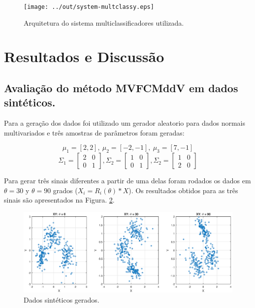 \documentclass[12pt]{article}
\begin{document}
\begin{figure}[h]
\centering
\texttt{[image: ../out/system-multclassy.eps]}
\caption{Arquitetura do sistema multiclassificadores utilizada.}
\label{fig:mult_system_classy}
\end{figure}  



\section{Resultados e Discussão}\label{RD}

\subsection{Avaliação do método MVFCMddV em dados sintéticos.}
Para a geração dos dados foi utilizado um gerador aleatorio para dados normais multivariados e três amostras de parâmetros  foram geradas:

$$\mu_1 = [2, 2], \ \mu_2 = [-2, -1], \ \mu_3 = [7, -1] $$
$$\Sigma_1 = \left[ \begin{matrix}
2 & 0 \\ 
0 & 1
\end{matrix} \right], 
\Sigma_2 = \left[ \begin{matrix}
1 & 0 \\ 
0 & 1
\end{matrix} \right], 
\Sigma_2 = \left[ \begin{matrix}
1 & 0 \\ 
2 & 0
\end{matrix} \right] $$

Para gerar três sinais diferentes a partir de uma delas foram rodados os dados em $\theta = 30$ y $\theta = 90$ grados ($X_i = R_i(\theta)*X$). Os resultados obtidos para as três sinais são apresentados na Figura. \ref{fig:xy_sinteticos}.

\begin{figure}[h]
\centering
\includegraphics[width=4.5in]{../out/xy-sinteticos.eps}
\caption{Dados sintéticos gerados.}
\label{fig:xy_sinteticos}
\end{figure}  
\end{document}
